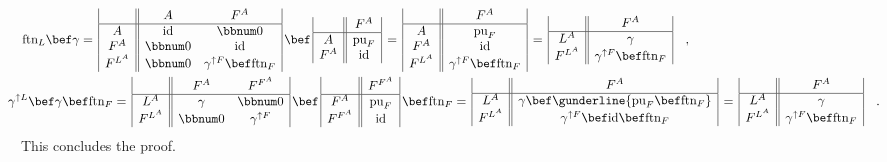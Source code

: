 \begin{align*}
 & \text{ftn}_{L}\bef\gamma=\,\begin{array}{|c||cc|}
 & A & F^{A}\\
\hline A & \text{id} & \bbnum 0\\
F^{A} & \bbnum 0 & \text{id}\\
F^{L^{A}} & \bbnum 0 & \gamma^{\uparrow F}\bef\text{ftn}_{F}
\end{array}\,\bef\,\begin{array}{|c||c|}
 & F^{A}\\
\hline A & \text{pu}_{F}\\
F^{A} & \text{id}
\end{array}\,=\,\begin{array}{|c||c|}
 & F^{A}\\
\hline A & \text{pu}_{F}\\
F^{A} & \text{id}\\
F^{L^{A}} & \gamma^{\uparrow F}\bef\text{ftn}_{F}
\end{array}\,=\,\begin{array}{|c||c|}
 & F^{A}\\
\hline L^{A} & \gamma\\
F^{L^{A}} & \gamma^{\uparrow F}\bef\text{ftn}_{F}
\end{array}\quad,\\
 & \negthickspace\negthickspace\negthickspace\negthickspace\gamma^{\uparrow L}\bef\gamma\bef\text{ftn}_{F}=\,\begin{array}{|c||cc|}
 & F^{A} & F^{F^{A}}\\
\hline L^{A} & \gamma & \bbnum 0\\
F^{L^{A}} & \bbnum 0 & \gamma^{\uparrow F}
\end{array}\,\bef\,\begin{array}{|c||c|}
 & F^{F^{A}}\\
\hline F^{A} & \text{pu}_{F}\\
F^{F^{A}} & \text{id}
\end{array}\,\bef\text{ftn}_{F}=\,\begin{array}{|c||c|}
 & F^{A}\\
\hline L^{A} & \gamma\bef\gunderline{\text{pu}_{F}\bef\text{ftn}_{F}}\\
F^{L^{A}} & \gamma^{\uparrow F}\bef\text{id}\bef\text{ftn}_{F}
\end{array}\,=\,\begin{array}{|c||c|}
 & F^{A}\\
\hline L^{A} & \gamma\\
F^{L^{A}} & \gamma^{\uparrow F}\bef\text{ftn}_{F}
\end{array}\quad.
\end{align*}
This concludes the proof.

